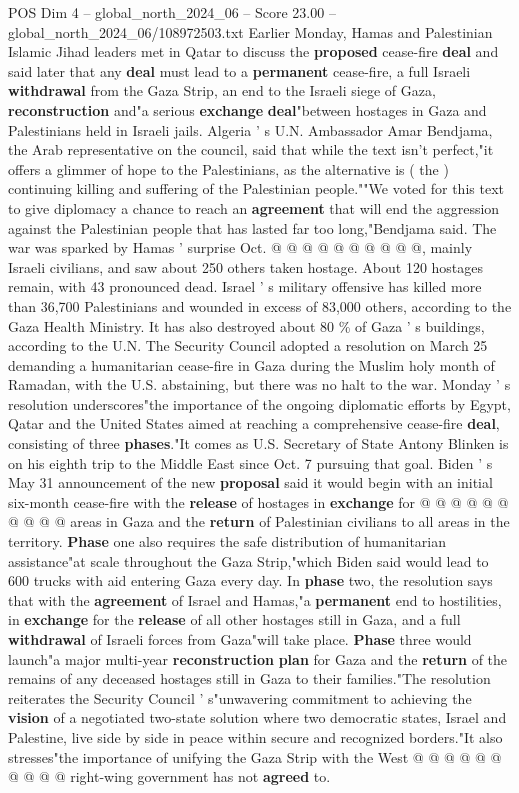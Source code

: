 \begin{textsample}{POS Dim 4 – global\_north\_2024\_06 – Score 23.00 – global\_north\_2024\_06/108972503.txt}
Earlier Monday, Hamas and Palestinian Islamic Jihad leaders met in Qatar to discuss the \textbf{proposed} cease-fire \textbf{deal} and said later that any \textbf{deal} must lead to a \textbf{permanent} cease-fire, a full Israeli \textbf{withdrawal} from the Gaza Strip, an end to the Israeli siege of Gaza, \textbf{reconstruction} and"a serious \textbf{exchange} \textbf{deal}"between hostages in Gaza and Palestinians held in Israeli jails.
Algeria ' s U.N.
Ambassador Amar Bendjama, the Arab representative on the council, said that while the text isn't perfect,"it offers a glimmer of hope to the Palestinians, as the alternative is ( the ) continuing killing and suffering of the Palestinian people.""We voted for this text to give diplomacy a chance to reach an \textbf{agreement} that will end the aggression against the Palestinian people that has lasted far too long,"Bendjama said.
The war was sparked by Hamas ' surprise Oct. @ @ @ @ @ @ @ @ @ @, mainly Israeli civilians, and saw about 250 others taken hostage.
About 120 hostages remain, with 43 pronounced dead.
Israel ' s military offensive has killed more than 36,700 Palestinians and wounded in excess of 83,000 others, according to the Gaza Health Ministry.
It has also destroyed about 80 \% of Gaza ' s buildings, according to the U.N.
The Security Council adopted a resolution on March 25 demanding a humanitarian cease-fire in Gaza during the Muslim holy month of Ramadan, with the U.S. abstaining, but there was no halt to the war.
Monday ' s resolution underscores"the importance of the ongoing diplomatic efforts by Egypt, Qatar and the United States aimed at reaching a comprehensive cease-fire \textbf{deal}, consisting of three \textbf{phases}."It comes as U.S.
Secretary of State Antony Blinken is on his eighth trip to the Middle East since Oct. 7 pursuing that goal.
Biden ' s May 31 announcement of the new \textbf{proposal} said it would begin with an initial six-month cease-fire with the \textbf{release} of hostages in \textbf{exchange} for @ @ @ @ @ @ @ @ @ @ areas in Gaza and the \textbf{return} of Palestinian civilians to all areas in the territory. \textbf{Phase} one also requires the safe distribution of humanitarian assistance"at scale throughout the Gaza Strip,"which Biden said would lead to 600 trucks with aid entering Gaza every day.
In \textbf{phase} two, the resolution says that with the \textbf{agreement} of Israel and Hamas,"a \textbf{permanent} end to hostilities, in \textbf{exchange} for the \textbf{release} of all other hostages still in Gaza, and a full \textbf{withdrawal} of Israeli forces from Gaza"will take place. \textbf{Phase} three would launch"a major multi-year \textbf{reconstruction} \textbf{plan} for Gaza and the \textbf{return} of the remains of any deceased hostages still in Gaza to their families."The resolution reiterates the Security Council ' s"unwavering commitment to achieving the \textbf{vision} of a negotiated two-state solution where two democratic states, Israel and Palestine, live side by side in peace within secure and recognized borders."It also stresses"the importance of unifying the Gaza Strip with the West @ @ @ @ @ @ @ @ @ @ right-wing government has not \textbf{agreed} to.


\end{textsample}
